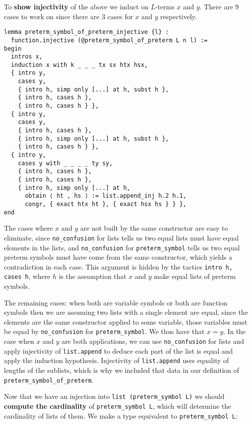 \documentclass{article}
\newcommand{\<}{\langle}
\renewcommand{\>}{\rangle}
\theoremstyle{definitionstyle}
\theoremstyle{exercisestyle}
\theoremstyle{remarkstyle}
\begin{document}
To \textbf{show injectivity} of the above we induct on $L$-terms $x$ and $y$.
There are $9$ cases to work on since there are $3$ cases for $x$ and $y$
respectively.

\begin{lstlisting}
lemma preterm_symbol_of_preterm_injective {l} :
  function.injective (@preterm_symbol_of_preterm L n l) :=
begin
  intros x,
  induction x with k _ _ _ tx sx htx hsx,
  { intro y,
    cases y,
    { intro h, simp only [...] at h, subst h },
    { intro h, cases h },
    { intro h, cases h } },
  { intro y,
    cases y,
    { intro h, cases h },
    { intro h, simp only [...] at h, subst h },
    { intro h, cases h } },
  { intro y,
    cases y with _ _ _ _ ty sy,
    { intro h, cases h },
    { intro h, cases h },
    { intro h, simp only [...] at h,
      obtain ⟨ ht , hs ⟩ := list.append_inj h.2 h.1,
      congr, { exact htx ht }, { exact hsx hs } } },
end \end{lstlisting}

The cases where $x$ and $y$ are not built by the same constructor
are easy to eliminate, since \texttt{no\_confusion}
for lists tells us two equal lists must have equal elements in the lists,
and \texttt{no\_confusion} for \texttt{preterm\_symbol} tells us
two equal preterm symbols must have come from the same constructor,
which yields a contradiction in each case.
This argument is hidden by the tactics \texttt{intro h, cases h},
where $h$ is the assumption that $x$ and $y$
make equal lists of preterm symbols.

The remaining cases: when both are variable symbols or both are function symbols
then we are assuming two lists with a single element are equal,
since the elements are the same constructor applied to some variable,
those variables must be equal by \texttt{no\_confusion} for
\texttt{preterm\_symbol}.
We thus have that $x = y$.
In the case when $x$ and $y$ are both applications,
we can use \texttt{no\_confusion} for lists and
apply injectivity of \texttt{list.append}
to deduce each part of the list is equal and apply the induction hypothesis.
Injectivity of \texttt{list.append} uses equality of lengths of the
sublists, which is why we included that data in our definition of
\texttt{preterm\_symbol\_of\_preterm}.

Now that we have an injection into \texttt{list (preterm\_symbol L)}
we should \textbf{compute the cardinality} of \texttt{preterm\_symbol L},
which will determine the cardinality of lists of them.
We make a type equivalent to \texttt{preterm\_symbol L}:
\end{document}
